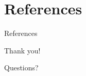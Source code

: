 \documentclass[aspectratio=169,onlytextwidth]{beamer}
\begin{document}
\begin{frame}[t]
\end{frame}

\begin{frame}
  \vskip0.4cm
\end{frame}


\section{References}

\begin{frame}[allowframebreaks]{References}
  \nocite{*} %
  
  
\end{frame}

\begin{frame}
  \begin{center}
    {\Huge Thank you!}

    \vskip1cm
    \normalsize Questions?
  \end{center}
\end{frame}
\end{document}
